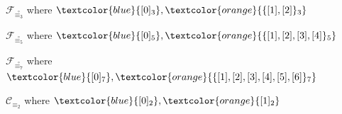 \documentclass[10pt,serif, professionalfont]{beamer}
\begin{document}
\begin{frame}{$\mathcal{F}_{\stackrel{\circ}{\equiv_{3}}}$ where 
    $\textcolor{blue}{[0]_{3}},\textcolor{orange}{\lbrace [1],[2] \rbrace_{3}}$}

    
\end{frame}
\begin{frame}{$\mathcal{F}_{\stackrel{\circ}{\equiv_{5}}}$ where 
    $\textcolor{blue}{[0]_{5}},\textcolor{orange}{\lbrace [1],[2],[3],[4] \rbrace_{5}}$}

    
\end{frame}
\begin{frame}{$\mathcal{F}_{\stackrel{\circ}{\equiv_{7}}}$ where 
    $\textcolor{blue}{[0]_{7}},\textcolor{orange}{\lbrace [1],[2],[3],[4],[5],[6] \rbrace_{7}}$}

    
\end{frame}


\begin{frame}{$\mathcal{C}_{\equiv_{2}}$ where 
    $\textcolor{blue}{[0]_{2}},\textcolor{orange}{[1]_{2}}$}

    
\end{frame}
\end{document}
